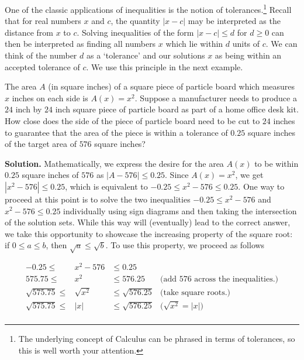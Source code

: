 One of the classic applications of inequalities is the notion of tolerances.\footnote{The underlying concept of Calculus can be phrased in terms of tolerances, so this is well worth your attention.}  Recall that for real numbers $x$ and $c$, the quantity $|x-c|$ may be interpreted as the distance from $x$ to $c$.  Solving inequalities of the form $|x-c| \leq d$ for $d \geq 0$ can then be interpreted as finding all numbers $x$ which lie within $d$ units of $c$.  We can think of the number $d$ as a `tolerance' and our solutions $x$ as being within an accepted tolerance of $c$.  We use this principle in the next example.

\begin{ex} The area $A$ (in square inches) of a square piece of particle board which measures $x$ inches on each side is $A(x) = x^2$.  Suppose a manufacturer needs to produce a $24$ inch by $24$ inch square piece of particle board as part of a home office desk kit. How close does the side of the piece of particle board need to be cut to $24$ inches to guarantee that the area of the piece is within a tolerance of $0.25$ square inches of the target area of $576$ square inches?  

\medskip

{\bf Solution.} Mathematically, we express the desire for the area $A(x)$ to be within $0.25$ square inches of $576$ as $|A - 576| \leq 0.25$.  Since $A(x) = x^2$, we get $|x^2 - 576| \leq 0.25$, which is equivalent to $-0.25 \leq x^2 - 576 \leq 0.25$.  One way to proceed at this point is to solve the two inequalities $-0.25 \leq x^2 - 576$ and $x^2 - 576 \leq 0.25$ individually using sign diagrams and then taking the intersection of the solution sets.  While this way will (eventually) lead to the correct answer, we take this opportunity to showcase the increasing property of the square root:  if $0 \leq a \leq b$, then $\sqrt{a} \leq \sqrt{b}$.  To use this property, we proceed as follows

\[ \begin{array}{rclr}

-0.25  \leq & x^2 - 576 & \leq 0.25 & \\
575.75 \leq & x^2 & \leq 576.25 & \text{(add $576$ across the inequalities.)} \\
\sqrt{575.75} \leq & \sqrt{x^2} & \leq \sqrt{576.25} & \text{(take square roots.)} \\
\sqrt{575.75} \leq & |x| & \leq \sqrt{576.25} & \text{($\sqrt{x^2} = |x|$)} \\ \end{array} \]


\end{ex}
